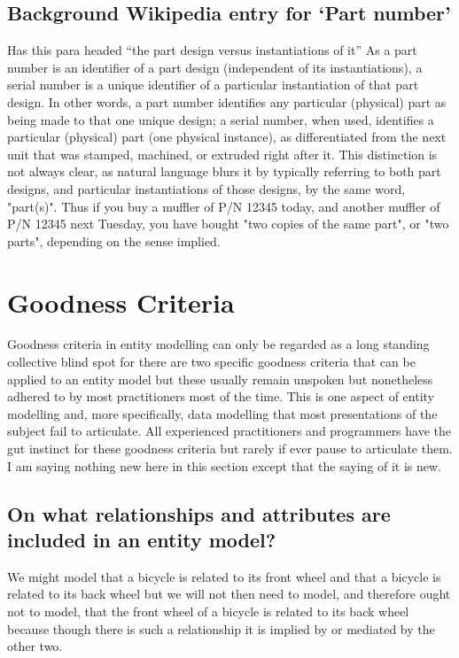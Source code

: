 \subsection{Background Wikipedia entry for `Part number'}
Has this para headed ``the part design versus instantiations of it''
As a part number is an identifier of a part design (independent of its instantiations), a serial number is a unique identifier of a particular instantiation of that part design. In other words, a part number identifies any particular (physical) part as being made to that one unique design; a serial number, when used, identifies a particular (physical) part (one physical instance), as differentiated from the next unit that was stamped, machined, or extruded right after it. This distinction is not always clear, as natural language blurs it by typically referring to both part designs, and particular instantiations of those designs, by the same word, "part(s)". Thus if you buy a muffler of P/N 12345 today, and another muffler of P/N 12345 next Tuesday, you have bought "two copies of the same part", or "two parts", depending on the sense implied.

\section{Goodness Criteria}
 Goodness criteria in entity modelling  can only be regarded as a long standing collective blind spot for  
there are two specific goodness criteria that can be  applied to an entity model but these  usually remain unspoken but 
nonetheless  adhered to by most practitioners most of the time. This is one aspect of entity modelling and, more specifically, data modelling that most presentations of the subject fail to articulate.  
All experienced practitioners and programmers have the gut instinct for these 
 goodness criteria but rarely if ever pause to articulate them.  
 I am saying nothing new here in this section except that the saying of it is new. 

\subsection{On what relationships and attributes are included in an entity model?}
\mynote We might model that a bicycle is related to its front wheel and that a bicycle is related to its back wheel but we will not then need to model,  and therefore ought not to model, that the front wheel of a bicycle is related to its back wheel because though there is such a relationship it is implied by or mediated by the other two.  

